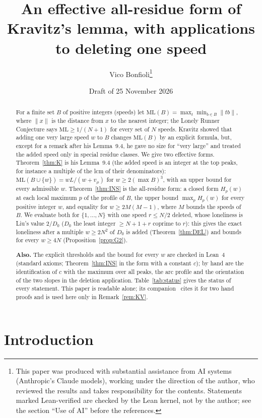 \documentclass[11pt]{article}
\title{An effective all-residue form of Kravitz's lemma, with applications to deleting one speed}
\author{Vico Bonfioli\thanks{This paper was produced with substantial assistance from AI systems (Anthropic's Claude models), working under the direction of the author, who reviewed the results and takes responsibility for the contents. Statements marked Lean-verified are checked by the Lean kernel, not by the author; see the section ``Use of AI'' before the references.}}
\date{Draft of 25 November 2026}
\theoremstyle{definition}
\theoremstyle{remark}
\newcommand{\nd}[1]{\lVert #1\rVert}
\newcommand{\ML}{\mathrm{ML}}
\begin{document}
\maketitle

\begin{abstract}
\noindent For a finite set $B$ of positive integers (speeds) let $\ML(B)=\max_{t}\min_{b\in B}\nd{tb}$, where $\nd{x}$ is the distance from $x$ to the nearest integer; the Lonely Runner Conjecture says $\ML\ge1/(N+1)$ for every set of $N$ speeds.
Kravitz showed that adding one very large speed $w$ to $B$ changes $\ML(B)$ by an explicit formula, but, except for a remark after his Lemma~9.4, he gave no size for ``very large'' and treated the added speed only in special residue classes.
We give two effective forms. Theorem~\ref{thm:K} is his Lemma~9.4 (the added speed is an integer at the top peaks, for instance a multiple of the lcm of their denominators): $\ML(B\cup\{w\})=wL/(w+v_\mu)$ for $w\ge2(\max B)^3$, with an upper bound for every admissible $w$. Theorem~\ref{thm:INS} is the all-residue form: a closed form $H_p(w)$ at each local maximum $p$ of the profile of $B$, the upper bound $\max_pH_p(w)$ for every positive integer $w$, and equality for $w\ge2M(M-1)$, where $M$ bounds the speeds of $B$. We evaluate both for $\{1,\dots,N\}$ with one speed $r\le N/2$ deleted, whose loneliness is Liu's value $2/D_0$ ($D_0$ the least integer $\ge N+1+r$ coprime to $r$): this gives the exact loneliness after a multiple $w\ge2N^2$ of $D_0$ is added (Theorem~\ref{thm:DEL}) and bounds for every $w\ge4N$ (Proposition~\ref{prop:G2}).

\medskip\noindent\textbf{Also.} The explicit thresholds and the bound for every $w$ are checked in Lean~4 (standard axioms; Theorem~\ref{thm:INS} in the form with a constant $c$); by hand are the identification of $c$ with the maximum over all peaks, the arc profile and the orientation of the two slopes in the deletion application. Table~\ref{tab:status} gives the status of every statement. This paper is readable alone; its companion~\cite{A1} cites it for two hand proofs and is used here only in Remark~\ref{rem:KV}.
\end{abstract}

\section{Introduction}\label{sec:intro}
\end{document}
